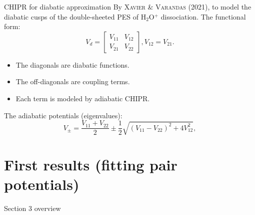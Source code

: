 \documentclass{beamer}
\begin{document}
\begin{frame}{CHIPR for diabatic approximation}
    By \textsc{Xavier \& Varandas} (2021), to model the diabatic cusps of the double-sheeted PES of H$_2$O$^+$ dissociation. The functional form:
    \begin{equation}
        V_d = 
        \begin{bmatrix}
            V_{11} & V_{12} \\
            V_{21} & V_{22}
        \end{bmatrix}
        , V_{12} = V_{21}.
    \label{2x2diabaticmatrix}
    \end{equation}
    \begin{itemize}
        \item The diagonals are diabatic functions.
        \item The off-diagonals are coupling terms.
        \item Each term is modeled by adiabatic CHIPR.
    \end{itemize}
    The adiabatic potentials (eigenvalues):
    \begin{equation}
        V_{\pm} = \frac{V_{11} + V_{22}}{2} \pm \frac{1}{2}\sqrt{(V_{11} - V_{22})^2 + 4V_{12}^2},
        \label{2x2ev}
    \end{equation}
\end{frame}

\section{First results (fitting pair potentials)}
\begin{frame}{Section 3 overview}
    \tableofcontents[sections={3}]
\end{frame}
\end{document}
